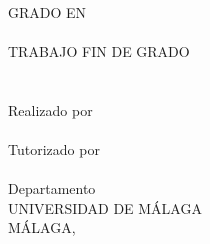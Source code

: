 \begin{center}
  \MakeUppercase{\facultad} \\
  GRADO EN \MakeUppercase{\grado} \\
  \vspace{1cm}
  \MakeUppercase{\area} \\
  \vspace{2cm}
  \MakeUppercase{Trabajo fin de grado}\\
  \vspace{2cm}
  {\large	\tituloes} \\
  \ifdef{\subtituloes}{
    \textit{\subtituloes} \\
  }{}
  {\large	\tituloen} \\
  \ifdef{\subtituloen}{
    \textit{\subtituloen} \\
  }{}  \bigbreak
  Realizado por \\
  \textbf{\alumno} \\
  Tutorizado por \\
  \textbf{\tutor} \\
  Departamento \\
  \textbf{\departamento}
  \bigbreak
  UNIVERSIDAD DE MÁLAGA \\
  MÁLAGA, \fecha
\end{center}


